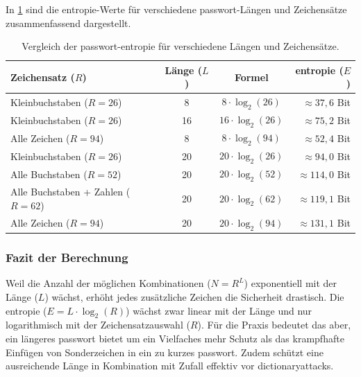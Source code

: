 \documentclass[12pt,a4paper]{article}
\begin{document}
In \cref{tab:entropie_vergleich} sind die \gls{entropie}-Werte für verschiedene \gls{passwort}-Längen und Zeichensätze zusammenfassend dargestellt.

\begin{table}[htbp]
    \centering
    \begin{tabular}{|l|c|c|r|}
        \hline
        \textbf{Zeichensatz ($R$)} & \textbf{Länge ($L$)} & \textbf{Formel} & \textbf{\gls{entropie} ($E$)} \\
        \hline
        Kleinbuchstaben ($R=26$) & 8 & $8 \cdot \log_2(26)$ & $\approx 37{,}6$ Bit \\
        Kleinbuchstaben ($R=26$) & 16 & $16 \cdot \log_2(26)$ & $\approx 75{,}2$ Bit \\
        Alle Zeichen ($R=94$) & 8 & $8 \cdot \log_2(94)$ & $\approx 52{,}4$ Bit \\
        Kleinbuchstaben ($R=26$) & 20 & $20 \cdot \log_2(26)$ & $\approx 94{,}0$ Bit \\
        Alle Buchstaben ($R=52$) & 20 & $20 \cdot \log_2(52)$ & $\approx 114{,}0$ Bit \\
        Alle Buchstaben + Zahlen ($R=62$) & 20 & $20 \cdot \log_2(62)$ & $\approx 119{,}1$ Bit \\
        Alle Zeichen ($R=94$) & 20 & $20 \cdot \log_2(94)$ & $\approx 131{,}1$ Bit \\
        \hline
    \end{tabular}
    \caption{Vergleich der \gls{passwort}-\gls{entropie} für verschiedene Längen und Zeichensätze.}
    \label{tab:entropie_vergleich}
\end{table}

\subsubsection{Fazit der Berechnung}
Weil die Anzahl der möglichen Kombinationen ($N = R^L$) exponentiell mit der Länge ($L$) wächst, erhöht jedes zusätzliche Zeichen die Sicherheit drastisch. Die \gls{entropie} ($E = L \cdot \log_2(R)$) wächst zwar linear mit der Länge und nur logarithmisch mit der Zeichensatzauswahl ($R$). Für die Praxis bedeutet das aber, ein längeres \gls{passwort} bietet um ein Vielfaches mehr Schutz als das krampfhafte Einfügen von Sonderzeichen in ein zu kurzes \gls{passwort}. Zudem schützt eine ausreichende Länge in Kombination mit Zufall effektiv vor \gls{dictionaryattack}s.

\newpage
\end{document}
